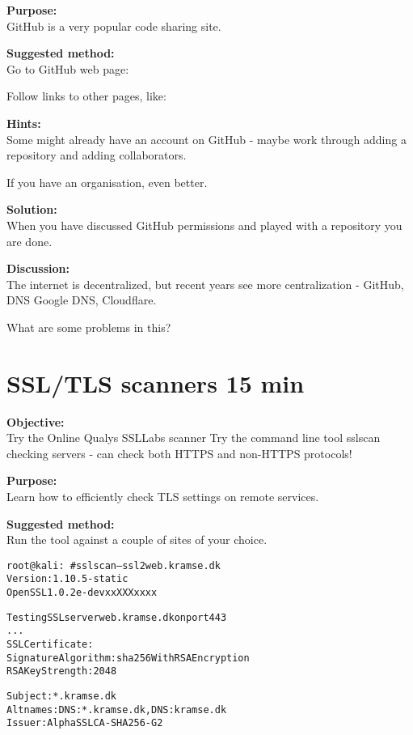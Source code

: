 \documentclass[a4paper,11pt,notitlepage]{report}
\begin{document}
{\bf Purpose:}\\
GitHub is a very popular code sharing site.

{\bf Suggested method:}\\
Go to GitHub web page:\\

Follow links to other pages, like:\\


{\bf Hints:}\\
Some might already have an account on GitHub - maybe work through adding a repository and adding collaborators.

If you have an organisation, even better.

{\bf Solution:}\\
When you have discussed GitHub permissions and played with a repository you are done.

{\bf Discussion:}\\
The internet is decentralized, but recent years see more centralization - GitHub, DNS Google DNS, Cloudflare.

What are some problems in this?



\chapter{SSL/TLS scanners 15 min}
\label{ex:sslscan}

{\bf Objective:}\\
Try the Online Qualys SSLLabs scanner 
Try the command line tool sslscan checking servers - can check both HTTPS and non-HTTPS protocols!

{\bf Purpose:}\\
Learn how to efficiently check TLS settings on remote services.

{\bf Suggested method:}\\
Run the tool against a couple of sites of your choice.

\begin{alltt}\small
root@kali:~# sslscan --ssl2 web.kramse.dk
Version: 1.10.5-static
OpenSSL 1.0.2e-dev xx XXX xxxx

Testing SSL server web.kramse.dk on port 443
...
  SSL Certificate:
Signature Algorithm: sha256WithRSAEncryption
RSA Key Strength:    2048

Subject:  *.kramse.dk
Altnames: DNS:*.kramse.dk, DNS:kramse.dk
Issuer:   AlphaSSL CA - SHA256 - G2
\end{alltt}
\end{document}
